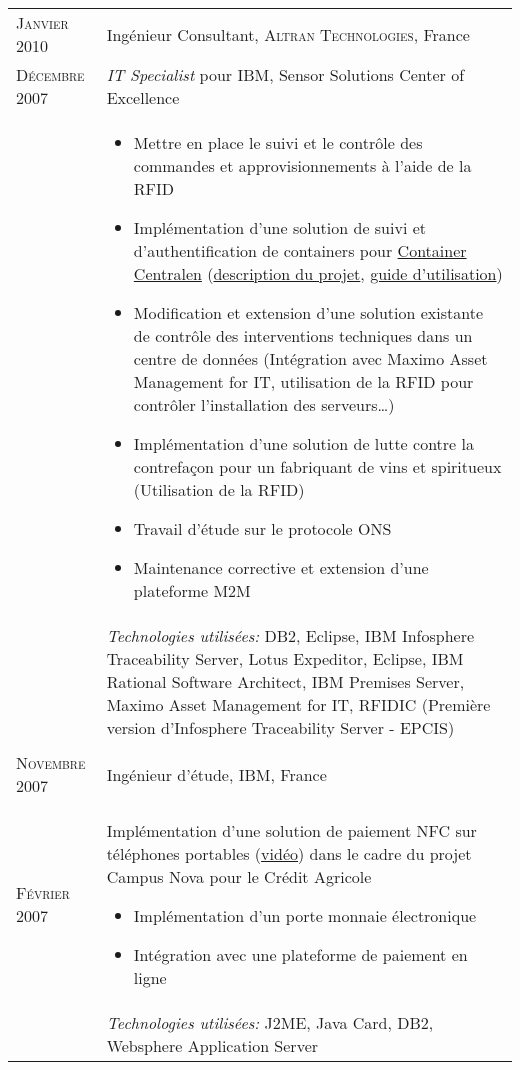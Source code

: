\begin{longtable}{R{2.5cm}|p{14.8cm}}
 	\textsc{Janvier 2010} & Ingénieur Consultant, \textsc{Altran Technologies}, France\\
 	\textsc{Décembre 2007}& \emph{IT Specialist} pour IBM, Sensor Solutions Center of Excellence\\&
 	\footnotesize{
 		\begin{itemize}
 		  \item Mettre en place le suivi et le contrôle des commandes et approvisionnements à l'aide de la RFID
 		  \item Implémentation d'une solution de suivi et d'authentification de containers pour \href{http://www.container-centralen.com/}{Container Centralen} (\href{http://www.container-centralen.co.uk/rfid/history.aspx}{description du projet}, \href{http://www.container-centralen.co.uk/rfid/user\%20guide\%20for\%20scanning.aspx}{guide d'utilisation})
 		  \item Modification et extension d'une solution existante de contrôle des interventions techniques dans un centre de données 
 	 	(Intégration avec Maximo Asset Management for IT, utilisation de la RFID pour contrôler l'installation des serveurs\ldots)
 	 	  \item Implémentation d'une solution de lutte contre la contrefaçon pour un fabriquant de vins et spiritueux (Utilisation de la RFID)
 	 	  \item Travail d'étude sur le protocole ONS
 	 	  \item Maintenance corrective et extension d'une plateforme M2M
 		\end{itemize}
 		\vspace{-1em}
 	}\\&
 	\footnotesize{\emph{Technologies utilisées:} DB2, Eclipse, IBM Infosphere Traceability Server, Lotus Expeditor, Eclipse, 
 	IBM Rational Software Architect, IBM Premises Server, Maximo Asset Management for IT, RFIDIC (Première version d'Infosphere Traceability Server - EPCIS) }\\
 \\
 	\textsc{Novembre 2007} & Ingénieur d'étude, \textsc{IBM}, France \\
 	\textsc{Février 2007}&
 	\footnotesize{
 	 	Implémentation d'une solution de paiement NFC sur téléphones portables (\href{http://www.nouvo.ch/s-007}{vidéo}) 
 	 	dans le cadre du projet Campus Nova pour le Crédit Agricole
 	 	\begin{itemize}
 	 	  \item Implémentation d'un porte monnaie électronique
 	 	  \item Intégration avec une plateforme de paiement en ligne
 	 	\end{itemize}
 	 	
	}\\&
	\vspace{-1em}
 	\footnotesize{\emph{Technologies utilisées:} J2ME, Java Card, DB2, Websphere Application Server}\\
\end{longtable}